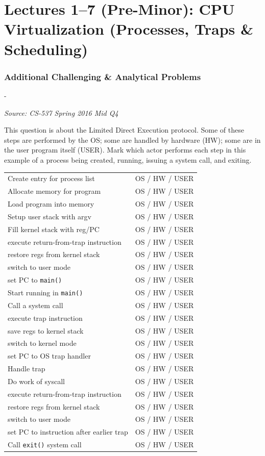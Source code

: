 \documentclass[11pt,a4paper]{article}
\makeatletter
\newcommand{\keepspace}[1]{\par\penalty-100\begingroup
  \setlength{\dimen@}{#1}\dimen@ii\pagegoal\advance\dimen@ii-\pagetotal
  \ifdim\dimen@>\dimen@ii\ifdim\dimen@ii>\z@\vfil\fi\break\fi\endgroup}
\newcounter{qn}[section]
\newenvironment{Qn}[4]{%
  \refstepcounter{qn}\keepspace{7\baselineskip}%
  \begin{tcolorbox}[qboxstyle, title={Q\thesection.\theqn\ \ [#1 \textbar\ #2]\ \ #4}]%
  {\footnotesize\color{g3}\textit{Source: #3}}\par\smallskip%
}{%
  \end{tcolorbox}%
}
\makeatother
\begin{document}
\clearpage

\section{Lectures 1--7 (Pre-Minor): CPU Virtualization (Processes, Traps \& Scheduling)}

\subsubsection*{Additional Challenging \& Analytical Problems}

\begin{Qn}{Hard}{Lect 4}{CS-537 Spring 2016 Mid Q4}{Limited Direct Execution: OS, hardware, or user?}
This question is about the Limited Direct Execution protocol. Some of these steps are performed by the OS; some are handled by hardware (HW); some are in the user program itself (USER). Mark which actor performs each step in this example of a process being created, running, issuing a system call, and exiting.
\begin{center}
\begin{tabular}{ll}
Create entry for process list & OS / HW / USER \\
Allocate memory for program & OS / HW / USER \\
Load program into memory & OS / HW / USER \\
Setup user stack with argv & OS / HW / USER \\
Fill kernel stack with reg/PC & OS / HW / USER \\
execute return-from-trap instruction & OS / HW / USER \\
restore regs from kernel stack & OS / HW / USER \\
switch to user mode & OS / HW / USER \\
set PC to \texttt{main()} & OS / HW / USER \\
Start running in \texttt{main()} & OS / HW / USER \\
Call a system call & OS / HW / USER \\
execute trap instruction & OS / HW / USER \\
save regs to kernel stack & OS / HW / USER \\
switch to kernel mode & OS / HW / USER \\
set PC to OS trap handler & OS / HW / USER \\
Handle trap & OS / HW / USER \\
Do work of syscall & OS / HW / USER \\
execute return-from-trap instruction & OS / HW / USER \\
restore regs from kernel stack & OS / HW / USER \\
switch to user mode & OS / HW / USER \\
set PC to instruction after earlier trap & OS / HW / USER \\
Call \texttt{exit()} system call & OS / HW / USER \\
\end{tabular}
\end{center}
\end{Qn}
\end{document}
